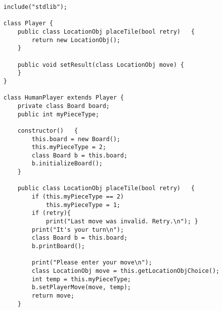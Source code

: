 \documentclass{plt}
\begin{document}
\begin{frame}[fragile]
\fontsize{7pt}{7pt}\selectfont
\begin{verbatim}
include("stdlib");

class Player {
    public class LocationObj placeTile(bool retry)   {
        return new LocationObj();
    }

    public void setResult(class LocationObj move) { 
    }
}

class HumanPlayer extends Player {
    private class Board board;
    public int myPieceType;

    constructor()   {
        this.board = new Board();
        this.myPieceType = 2;
        class Board b = this.board;
        b.initializeBoard();
    }

    public class LocationObj placeTile(bool retry)   {
        if (this.myPieceType == 2)
            this.myPieceType = 1;
        if (retry){
            print("Last move was invalid. Retry.\n"); }
        print("It's your turn\n");
        class Board b = this.board;
        b.printBoard();

        print("Please enter your move\n");
        class LocationObj move = this.getLocationObjChoice();
        int temp = this.myPieceType;
        b.setPlayerMove(move, temp);
        return move;
    }
\end{verbatim}
\end{frame}
\end{document}
